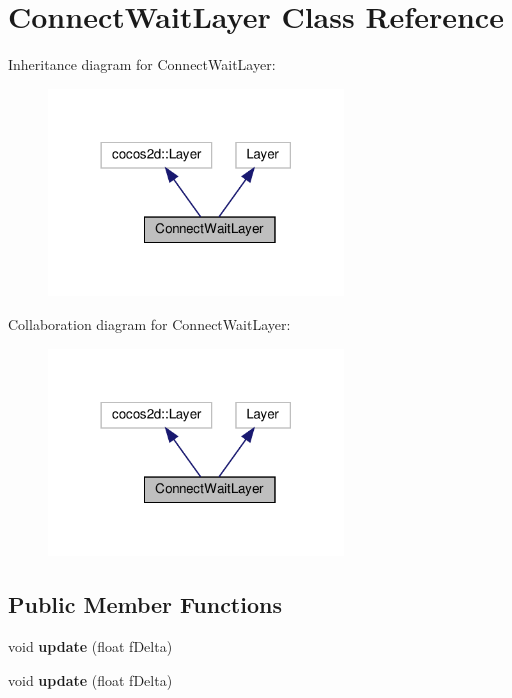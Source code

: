 \hypertarget{classConnectWaitLayer}{}\section{Connect\+Wait\+Layer Class Reference}
\label{classConnectWaitLayer}


Inheritance diagram for Connect\+Wait\+Layer\+:
\nopagebreak
\begin{figure}[H]
\begin{center}
\leavevmode
\includegraphics[width=222pt]{classConnectWaitLayer__inherit__graph}
\end{center}
\end{figure}


Collaboration diagram for Connect\+Wait\+Layer\+:
\nopagebreak
\begin{figure}[H]
\begin{center}
\leavevmode
\includegraphics[width=222pt]{classConnectWaitLayer__coll__graph}
\end{center}
\end{figure}
\subsection*{Public Member Functions}
\begin{DoxyCompactItemize}
\item 
\mbox{\label{classConnectWaitLayer_a923877c91af65b2ccd7045974fee14ca}} 
void {\bfseries update} (float f\+Delta)
\item 
\mbox{\label{classConnectWaitLayer_a923877c91af65b2ccd7045974fee14ca}} 
void {\bfseries update} (float f\+Delta)
\end{DoxyCompactItemize}


